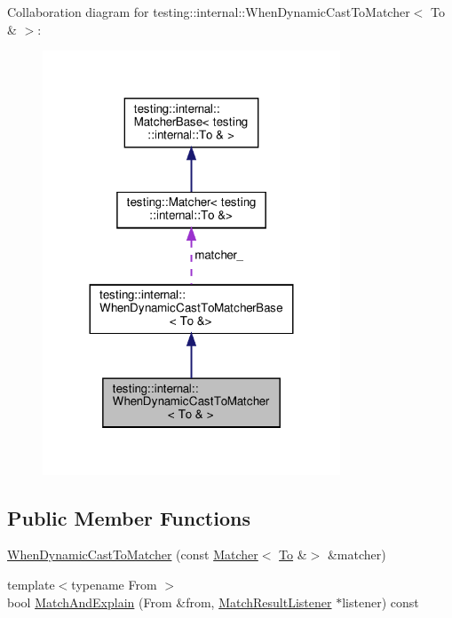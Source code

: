 Collaboration diagram for testing\+:\+:internal\+:\+:When\+Dynamic\+Cast\+To\+Matcher$<$ To \& $>$\+:
\nopagebreak
\begin{figure}[H]
\begin{center}
\leavevmode
\includegraphics[width=251pt]{classtesting_1_1internal_1_1_when_dynamic_cast_to_matcher_3_01_to_01_6_01_4__coll__graph}
\end{center}
\end{figure}
\subsection*{Public Member Functions}
\begin{DoxyCompactItemize}
\item 
\hyperlink{classtesting_1_1internal_1_1_when_dynamic_cast_to_matcher_3_01_to_01_6_01_4_a1ba7bc63566075d2afe18905e5c7ad76}{When\+Dynamic\+Cast\+To\+Matcher} (const \hyperlink{classtesting_1_1_matcher}{Matcher}$<$ \hyperlink{classtesting_1_1internal_1_1_to}{To} \&$>$ \&matcher)
\item 
{\footnotesize template$<$typename From $>$ }\\bool \hyperlink{classtesting_1_1internal_1_1_when_dynamic_cast_to_matcher_3_01_to_01_6_01_4_a1eb76a60d0943519623f438b29f70a5f}{Match\+And\+Explain} (From \&from, \hyperlink{classtesting_1_1_match_result_listener}{Match\+Result\+Listener} $\ast$listener) const
\end{DoxyCompactItemize}
